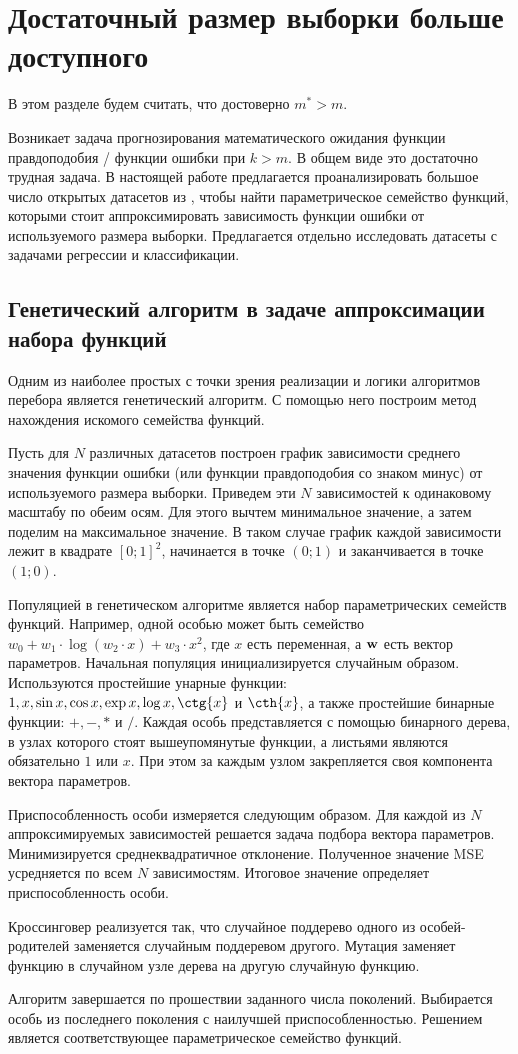 \section{Достаточный размер выборки больше доступного}\label{sec3}

В этом разделе будем считать, что достоверно $m^* > m$.

Возникает задача прогнозирования математического ожидания функции правдоподобия / функции ошибки при $k > m$. В общем виде это достаточно трудная задача. В настоящей работе предлагается проанализировать большое число открытых датасетов из \citep{UCI}, чтобы найти параметрическое семейство функций, которыми стоит аппроксимировать зависимость функции ошибки от используемого размера выборки. Предлагается отдельно исследовать датасеты с задачами регрессии и классификации.

\subsection{Генетический алгоритм в задаче аппроксимации набора функций}\label{ga}

Одним из наиболее простых с точки зрения реализации и логики алгоритмов перебора является генетический алгоритм. С помощью него построим метод нахождения искомого семейства функций. 

Пусть для $N$ различных датасетов построен график зависимости среднего значения функции ошибки (или функции правдоподобия со знаком минус) от используемого размера выборки. Приведем эти $N$ зависимостей к одинаковому масштабу по обеим осям. Для этого вычтем минимальное значение, а затем поделим на максимальное значение. В таком случае график каждой зависимости лежит в квадрате $[0; 1]^2$, начинается в точке $(0; 1)$ и заканчивается в точке $(1; 0)$.

Популяцией в генетическом алгоритме является набор параметрических семейств функций.
Например, одной особью может быть семейство $w_0 + w_1 \cdot \log(w_2 \cdot x) + w_3 \cdot x^2$, где $x$ есть переменная, а $\mathbf{w}$ есть вектор параметров. Начальная популяция инициализируется случайным образом. Используются простейшие унарные функции: $1, x, \sin{x}, \cos{x}, \exp{x}, \log{x}, \ctg{x}$ и $\cth{x}$, а также простейшие бинарные функции: $+, -, *$ и $/$. Каждая особь представляется с помощью бинарного дерева, в узлах которого стоят вышеупомянутые функции, а листьями являются обязательно $1$ или $x$. При этом за каждым узлом закрепляется своя компонента вектора параметров.

Приспособленность особи измеряется следующим образом. Для каждой из $N$ аппроксимируемых зависимостей решается задача подбора вектора параметров. Минимизируется среднеквадратичное отклонение. Полученное значение MSE усредняется по всем $N$ зависимостям. Итоговое значение определяет приспособленность особи.

Кроссинговер реализуется так, что случайное поддерево одного из особей-родителей заменяется случайным поддеревом другого. Мутация заменяет функцию в случайном узле дерева на другую случайную функцию. 

Алгоритм завершается по прошествии заданного числа поколений. Выбирается особь из последнего поколения с наилучшей приспособленностью. Решением является соответствующее параметрическое семейство функций.
